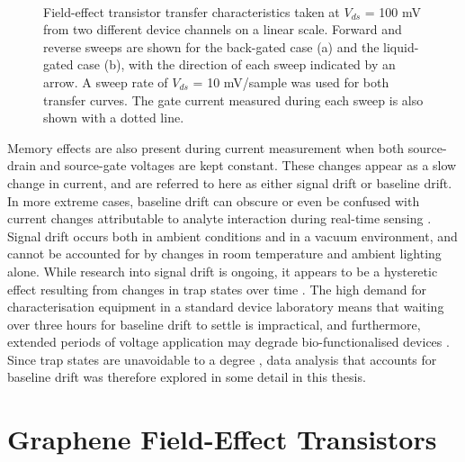 \documentclass[
  a4paper,
]{scrbook}
\begin{document}
\begin{figure}
\begin{minipage}[t]{0.45\linewidth}
\end{minipage}%
%
\begin{minipage}[t]{0.01\linewidth}

{\centering 

~

}

\end{minipage}%

\caption{\label{fig-gating-hysteresis}Field-effect transistor transfer
characteristics taken at \(V_{ds}\) = 100 mV from two different device
channels on a linear scale. Forward and reverse sweeps are shown for the
back-gated case (a) and the liquid-gated case (b), with the direction of
each sweep indicated by an arrow. A sweep rate of \(V_{ds}\) = 10
mV/sample was used for both transfer curves. The gate current measured
during each sweep is also shown with a dotted line.}

\end{figure}

Memory effects are also present during current measurement when both
source-drain and source-gate voltages are kept constant. These changes
appear as a slow change in current, and are referred to here as either
signal drift or baseline drift. In more extreme cases, baseline drift
can obscure or even be confused with current changes attributable to
analyte interaction during real-time sensing \autocite{Noyce2019}.
Signal drift occurs both in ambient conditions and in a vacuum
environment, and cannot be accounted for by changes in room temperature
and ambient lighting alone. While research into signal drift is ongoing,
it appears to be a hysteretic effect resulting from changes in trap
states over time \autocite{Lin2006,Bargaoui2018,Noyce2019}. The high
demand for characterisation equipment in a standard device laboratory
means that waiting over three hours for baseline drift to settle is
impractical, and furthermore, extended periods of voltage application
may degrade bio-functionalised devices \autocite{Noyce2019}. Since trap
states are unavoidable to a degree \autocite{DiMaria1993,Collins2000},
data analysis that accounts for baseline drift was therefore explored in
some detail in this thesis.

\hypertarget{graphene-field-effect-transistors}{%
\section{Graphene Field-Effect
Transistors}\label{graphene-field-effect-transistors}}
\end{document}
